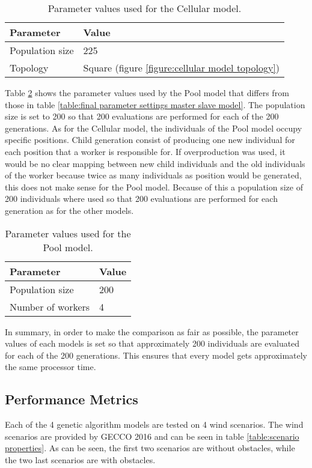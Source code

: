 \begin{table}
\centering
\caption{Parameter values used for the Cellular model.}
\label{table:final parameter settings cellular model}
\begin{tabular}{l|l}
\textbf{Parameter} & \textbf{Value} \\ 
\hline 
Population size & 225 \\
Topology & Square (figure \ref{figure:cellular model topology}) \\  
\end{tabular}
\end{table}

\noindent Table \ref{table:final parameter settings pool model} shows the parameter values used by the Pool model that differs from those in table \ref{table:final parameter settings master slave model}. The population size is set to 200 so that 200 evaluations are performed for each of the 200 generations. As for the Cellular model, the individuals of the Pool model occupy specific positions. Child generation consist of producing one new individual for each position that a worker is responsible for. If overproduction was used, it would be no clear mapping between new child individuals and the old individuals of the worker because twice as many individuals as position would be generated, this does not make sense for the Pool model. Because of this a population size of 200 individuals where used so that 200 evaluations are performed for each generation as for the other models.\\

\begin{table}[h!]
\centering
\caption{Parameter values used for the Pool model.}
\label{table:final parameter settings pool model}
\begin{tabular}{l|l}
\textbf{Parameter} & \textbf{Value} \\ 
\hline 
Population size & 200 \\  
Number of workers & 4 \\ 
\end{tabular}
\end{table}

\noindent In summary, in order to make the comparison as fair as possible, the parameter values of each models is set so that approximately 200 individuals are evaluated for each of the 200 generations. This ensures that every model gets approximately the same processor time.\\


\subsection{Performance Metrics}\label{subsection:performance metrics}
\noindent Each of the 4 genetic algorithm models are tested on 4 wind scenarios. The wind scenarios are provided by GECCO 2016 and can be seen in table \ref{table:scenario properties}. As can be seen, the first two scenarios are without obstacles, while the two last scenarios are with obstacles.\\


